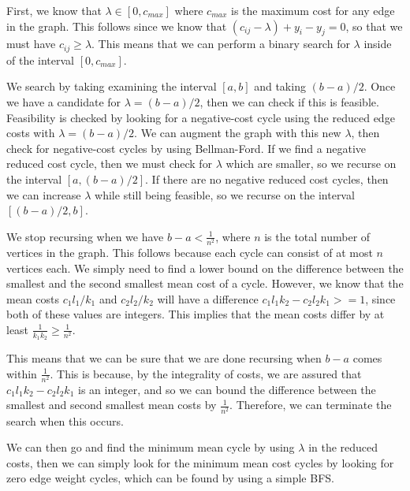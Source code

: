 \documentclass[psamsfonts]{amsart}
\newenvironment{sol}{\vspace{0.25cm}{\large \bfseries Solution:}}{\qedsymbol}
\begin{document}
\begin{sol}
First, we know that $\lambda \in [0, c_{max}]$ where $c_{max}$ is the maximum cost for any edge in the graph. This follows since we know that $(c_{ij} - \lambda) + y_i - y_j = 0$, so that we must have $c_{ij} \geq \lambda$. This means that we can perform a binary search for $\lambda$ inside of the interval $[0, c_{max}]$. 

We search by taking examining the interval $[a,b]$ and taking $(b-a)/2$. Once we have a candidate for $\lambda = (b-a)/2$, then we can check if this is feasible. Feasibility is checked by looking for a negative-cost cycle using the reduced edge costs with $\lambda = (b-a)/2$. We can augment the graph with this new $\lambda$, then check for negative-cost cycles by using Bellman-Ford. If we find a negative reduced cost cycle, then we must check for $\lambda$ which are smaller, so we recurse on the interval $[a, (b-a)/2]$. If there are no negative reduced cost cycles, then we can increase $\lambda$ while still being feasible, so we recurse on the interval $[(b-a)/2, b]$. 

We stop recursing when we have $b - a < \frac{1}{n^2}$, where $n$ is the total number of vertices in the graph. This follows because each cycle can consist of at most $n$ vertices each. We simply need to find a lower bound on the difference between the smallest and the second smallest mean cost of a cycle. However, we know that the mean costs $c_1 l_1 / k_1$ and $c_2 l_2 / k_2$ will have a difference $c_1 l_1 k_2 - c_2 l_2 k_1 >= 1$, since both of these values are integers. This implies that the mean costs differ by at least $\frac{1}{k_1 k_2} \geq \frac{1}{n^2}$. 

This means that we can be sure that we are done recursing when $b-a$ comes within $\frac{1}{n^2}$. This is because, by the integrality of costs, we are assured that $c_1 l_1 k_2 - c_2 l_2 k_1$ is an integer, and so we can bound the difference between the smallest and second smallest mean costs by $\frac{1}{n^2}$. Therefore, we can terminate the search when this occurs. 

We can then go and find the minimum mean cycle by using $\lambda$ in the reduced costs, then we can simply look for the minimum mean cost cycles by looking for zero edge weight cycles, which can be found by using a simple BFS.
\end{sol}
\end{document}
